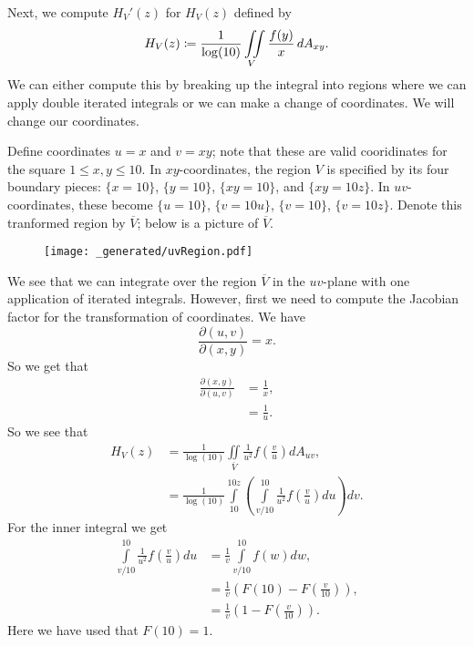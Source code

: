 Next, we compute \(H_V'(z)\) for \(H_V(z)\) defined by
\begin{equation}
H_V(z) \coloneqq \frac{1}{\log(10)} \iint\limits_V \frac{f(y)}{x}\, dA_{xy}. 
\end{equation}
We can either compute this by breaking up the integral into regions where we can apply double iterated integrals or we can make a
change of coordinates. We will change our coordinates.

Define coordinates \(u = x\) and \(v = xy\); note that these are valid cooridinates for the square \(1 \leq x, y \leq 10\). In \(xy\)-coordinates,
the region \(V\) is specified by its four boundary pieces: \(\{x = 10\}\), \(\{y = 10\}\), \(\{xy = 10\}\), and \(\{xy = 10z\}\). In \(uv\)-coordinates,
these become \(\{u = 10\}\), \(\{v = 10u\}\), \(\{v = 10\}\), \(\{v = 10z\}\). Denote this tranformed region by \(\overline{V}\); below is a picture of \(\overline{V}\).

\begin{figure}[h]
\centering
\texttt{[image: \_generated/uvRegion.pdf]}
\end{figure} 

We see that we can integrate over the region \(\overline{V}\) in the \(uv\)-plane with one application of iterated integrals. However,
first we need to compute the Jacobian factor for the transformation of coordinates. We have
\begin{equation}
\frac{\partial(u, v)}{\partial(x, y)} = x. 
\end{equation} 
So we get that
\begin{align}
\frac{\partial(x, y)}{\partial(u, v)} & = \frac{1}{x},\\
    & = \frac{1}{u}.
\end{align}
So we see that
\begin{align}
H_V(z) & = \frac{1}{\log(10)} \iint \limits_{\overline{V}} \frac{1}{u^2} f\left(\frac{v}{u}\right) dA_{uv}, \\
    & = \frac{1}{\log(10)} \int\limits_{10}^{10z} \left( \int\limits_{v/10}^{10} \frac{1}{u^2} f\left(\frac{v}{u}\right) du \right) dv.
\end{align}
For the inner integral we get
\begin{align}
\int\limits_{v/10}^{10} \frac{1}{u^2} f\left(\frac{v}{u}\right) du  & = \frac{1}{v} \int\limits_{v/10}^{10} f(w) dw, \\
    & = \frac{1}{v}\left(F(10) - F\left(\frac{v}{10}\right) \right), \\
    & =  \frac{1}{v}\left(1 - F\left(\frac{v}{10}\right) \right).
\end{align}
Here we have used that \(F(10) = 1\).


